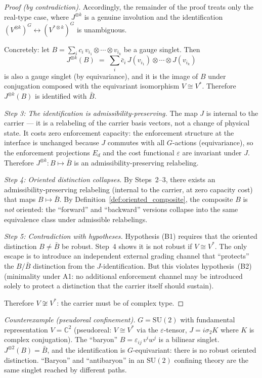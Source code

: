 \documentclass[11pt,a4paper]{article}
\theoremstyle{definition}
\newcommand{\SU}{\mathrm{SU}}
\begin{document}
\begin{proof}[Proof (by contradiction)]
\smallskip\noindent Accordingly, the remainder of the proof treats only
the real-type case, where $J^{\otimes k}$ is a genuine involution and
the identification $(V^{\otimes k})^G \leftrightarrow (V^{*\otimes k})^G$
is unambiguous.

Concretely: let $B = \sum_i c_i\, v_{i_1} \otimes \cdots \otimes v_{i_k}$
be a gauge singlet.  Then
\[
  J^{\otimes k}(B)
  \;=\; \sum_i \bar{c}_i\, J(v_{i_1}) \otimes \cdots \otimes J(v_{i_k})
\]
is also a gauge singlet (by equivariance), and it is the image of $B$ under
conjugation composed with the equivariant isomorphism $V \cong V^*$.
Therefore $J^{\otimes k}(B)$ is identified with $\bar{B}$.

\textit{Step 3: The identification is admissibility-preserving.}\quad
The map $J$ is internal to the carrier --- it is a relabeling of the carrier
basis vectors, not a change of physical state.  It costs zero enforcement
capacity: the enforcement structure at the interface is unchanged because
$J$ commutes with all $G$-actions (equivariance), so the enforcement
projections $E_d$ and the cost functional $\varepsilon$ are invariant under
$J$.  Therefore $J^{\otimes k}: B \mapsto \bar{B}$ is an
admissibility-preserving relabeling.

\textit{Step 4: Oriented distinction collapses.}\quad
By Steps~2--3, there exists an admissibility-preserving relabeling
(internal to the carrier, at zero capacity cost) that maps $B \mapsto \bar{B}$.
By Definition~\ref{def:oriented_composite}, the composite $B$ is
\emph{not} oriented: the ``forward'' and ``backward'' versions collapse
into the same equivalence class under admissible relabelings.

\textit{Step 5: Contradiction with hypotheses.}\quad
Hypothesis (B1) requires that the oriented distinction $B \ne \bar{B}$ be
robust.  Step~4 shows it is not robust if $V \cong V^*$.  The only escape
is to introduce an independent external grading channel that ``protects''
the $B / \bar{B}$ distinction from the $J$-identification.  But this
violates hypothesis~(B2) (minimality under A1: no additional enforcement
channel may be introduced solely to protect a distinction that the carrier
itself should sustain).

Therefore $V \not\cong V^*$: the carrier must be of complex type.
\end{proof}

\noindent\textit{Counterexample (pseudoreal confinement).}\quad
$G = \SU(2)$ with fundamental representation $V = \mathbb{C}^2$
(pseudoreal: $V \cong V^*$ via the $\varepsilon$-tensor, $J = i\sigma_2 K$
where $K$ is complex conjugation).  The ``baryon'' $B = \varepsilon_{ij}\, v^i w^j$
is a bilinear singlet.  $J^{\otimes 2}(B) = \bar{B}$, and the identification
is $G$-equivariant: there is no robust oriented distinction.
``Baryon'' and ``antibaryon'' in an $\SU(2)$ confining theory are the
same singlet reached by different paths.
\end{document}
